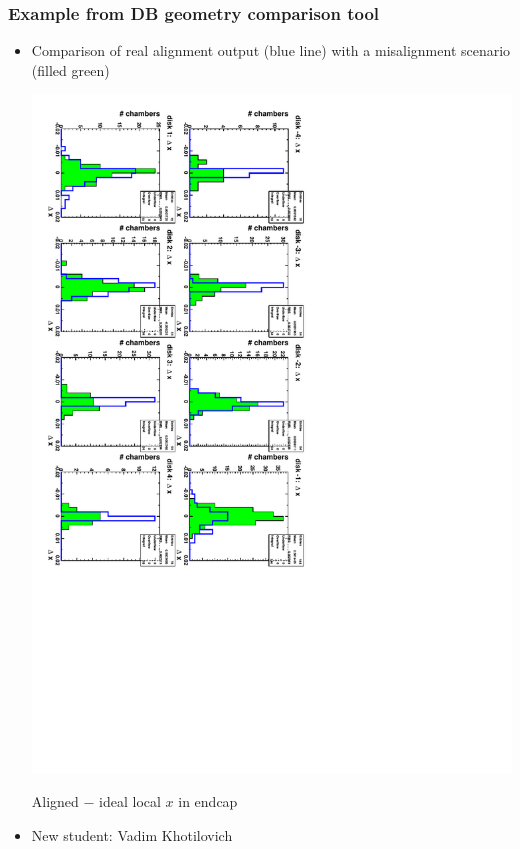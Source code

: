 \documentclass[compress]{beamer}
\begin{document}
\begin{frame}
\frametitle{Example from DB geometry comparison tool}
\begin{itemize}
\item Comparison of real alignment output (blue line) with a misalignment scenario (filled green)
\begin{center}
\includegraphics[height=0.8\linewidth, angle=90]{c_endcap_dxloc_overlay.pdf}

Aligned $-$ ideal local $x$ in endcap
\end{center}

\item New student: Vadim Khotilovich
\end{itemize}
\end{frame}




\end{document}
